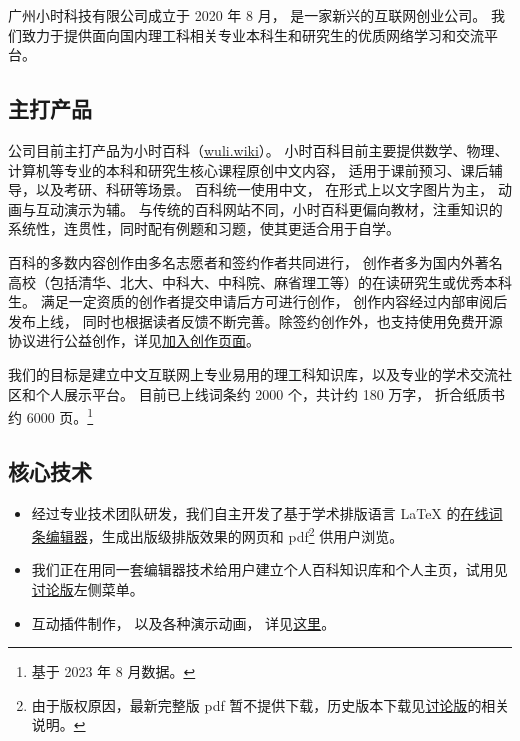 
广州小时科技有限公司成立于 2020 年 8 月， 是一家新兴的互联网创业公司。 我们致力于提供面向国内理工科相关专业本科生和研究生的优质网络学习和交流平台。


\subsection{主打产品}
公司目前主打产品为小时百科（\href{https://wuli.wiki}{wuli.wiki}）。 小时百科目前主要提供数学、物理、计算机等专业的本科和研究生核心课程原创中文内容， 适用于课前预习、课后辅导，以及考研、科研等场景。 百科统一使用中文， 在形式上以文字图片为主， 动画与互动演示为辅。 与传统的百科网站不同，小时百科更偏向教材，注重知识的系统性，连贯性，同时配有例题和习题，使其更适合用于自学。

百科的多数内容创作由多名志愿者和签约作者共同进行， 创作者多为国内外著名高校（包括清华、北大、中科大、中科院、麻省理工等）的在读研究生或优秀本科生。 满足一定资质的创作者提交申请后方可进行创作， 创作内容经过内部审阅后发布上线， 同时也根据读者反馈不断完善。除签约创作外，也支持使用免费开源协议进行公益创作，详见\href{https://wuli.wiki/forum/f9ec7f8e-ca37-4278-a77e-ba5c0e40e115}{加入创作页面}。

我们的目标是建立中文互联网上专业易用的理工科知识库，以及专业的学术交流社区和个人展示平台。 目前已上线词条约 2000 个，共计约 180 万字， 折合纸质书约 6000 页。\footnote{基于 2023 年 8 月数据。}

\subsection{核心技术}
\begin{itemize}
\item 经过专业技术团队研发，我们自主开发了基于学术排版语言 LaTeX 的\href{https://wuli.wiki/editor/}{在线词条编辑器}，生成出版级排版效果的网页和 pdf\footnote{由于版权原因，最新完整版 pdf 暂不提供下载，历史版本下载见\href{https://wuli.wiki/forum/}{讨论版}的相关说明。} 供用户浏览。
\item 我们正在用同一套编辑器技术给用户建立个人百科知识库和个人主页，试用见\href{https://wuli.wiki/forum/}{讨论版}左侧菜单。
\item 互动插件制作， 以及各种演示动画， 详见\href{http://wuli.wiki/apps}{这里}。
\end{itemize}
